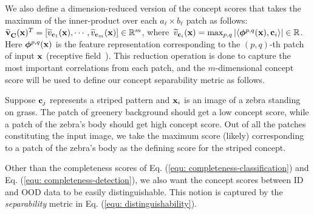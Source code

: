 %
%
%
We also define a dimension-reduced version of the concept scores that takes the maximum of the inner-product over each $a_\ell \times b_\ell$ patch as follows: $\widetilde{\mathbf{v}}^{}_{\mathbf{C}}(\mathbf{x})^T = [\widetilde{v}_{\mathbf{c}_1}(\mathbf{x}), \cdots, \widetilde{v}_{\mathbf{c}_m}(\mathbf{x})] \in \mathbb{R}^m$, where $\,\widetilde{v}_{\mathbf{c}_i}(\mathbf{x}) = \max_{p, q} |\langle \bm{\phi}^{p,q}(\mathbf{x}), \mathbf{c}_i \rangle| \in \mathbb{R}$. Here $\bm{\phi}^{p,q}(\mathbf{x})$ is the feature representation corresponding to the $(p, q)$-th patch of input $\mathbf{x}$ (\ie receptive field~\citep{araujo2019computing}).
This reduction operation is done to capture the most important correlations from each patch, and the $m$-dimensional concept score will be used to define our concept separability metric as follows.
%

\iffalse

Suppose $\mathbf{c}_j$ represents a striped pattern and $\mathbf{x}_i$ is an image of a zebra standing on grass.
The patch of greenery background should get a low concept score, while a patch of the zebra's body should get high concept score.
Out of all the patches constituting the input image, we take the maximum score (likely) corresponding to a patch of the zebra's body as the defining score for the striped concept.


 Other than the completeness scores of Eq. (\ref{equ: completeness-classification}) and Eq. (\ref{equ: completeness-detection}), we also want the concept scores between ID and OOD data to be easily distinguishable. This notion is captured by the \textit{separability} metric in Eq. (\ref{equ: distinguishability}). 

